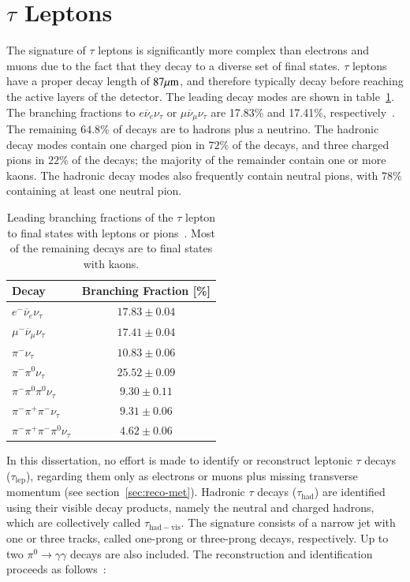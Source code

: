 \section{$\tau$ Leptons}\label{sec:event-reconstruction-taus}
The signature of $\tau$ leptons is significantly more complex than electrons and muons due to the fact that they decay to a diverse set of final states. $\tau$ leptons have a proper decay length of $87 \mu\mathrm{m}$, and therefore typically decay before reaching the active layers of the detector. The leading decay modes are shown in table~\ref{table:reco-tau-decays}. The branching fractions to $e\overline{\nu}_e\nu_{\tau}$ or $\mu\overline{\nu}_{\mu}\nu_{\tau}$ are 17.83\% and 17.41\%, respectively~\cite{pdg}. The remaining $64.8\%$ of decays are to hadrons plus a neutrino. The hadronic decay modes contain one charged pion in $72\%$ of the decays, and three charged pions in $22\%$ of the decays; the majority of the remainder contain one or more kaons. The hadronic decay modes also frequently contain neutral pions, with $78\%$ containing at least one neutral pion. 


\begin{table}[htbp]
	\centering
	\begin{tabular}{|l|c|}
		\hline
		Decay & Branching Fraction [\%] \\
		\hline
		$e^- \overline{\nu}_e \nu_{\tau}$ & $17.83 \pm 0.04$ \\
		\hline
		$\mu^- \overline{\nu}_{\mu} \nu_{\tau}$ & $17.41 \pm 0.04$ \\
		\hline
		$\pi^- \nu_{\tau}$ & $10.83 \pm 0.06$ \\
		\hline
		$\pi^- \pi^0 \nu_{\tau}$ & $25.52 \pm 0.09$ \\
		\hline
		$\pi^- \pi^0\pi^0\nu_{\tau}$ & $ 9.30 \pm 0.11$ \\
		\hline
		$\pi^-\pi^+\pi^-\nu_{\tau}$ & $9.31 \pm 0.06$ \\
		\hline
		$\pi^-\pi^+\pi^-\pi^0\nu_{\tau}$ & $4.62 \pm 0.06$ \\
		\hline
	\end{tabular}
	\caption[Leading branching fractions of the $\tau$ lepton to final states with leptons or pions. Most of the remaining decays are to final states with kaons.]{Leading branching fractions of the $\tau$ lepton to final states with leptons or pions~\cite{pdg}. Most of the remaining decays are to final states with kaons.}
	\label{table:reco-tau-decays}
\end{table}

In this dissertation, no effort is made to identify or reconstruct leptonic $\tau$ decays ($\tau_{\mathrm{lep}}$), regarding them only as electrons or muons plus missing transverse momentum (see section~\ref{sec:reco-met}). Hadronic $\tau$ decays ($\tau_{\mathrm{had}}$) are identified using their visible decay products, namely the neutral and charged hadrons, which are collectively called $\tau_{\mathrm{had-vis}}$. The signature consists of a narrow jet with one or three tracks, called one-prong or three-prong decays, respectively. Up to two $\pi^0\rightarrow\gamma\gamma$ decays are also included. The reconstruction and identification proceeds as follows~\cite{TheATLASCollaboration:2015be}:

